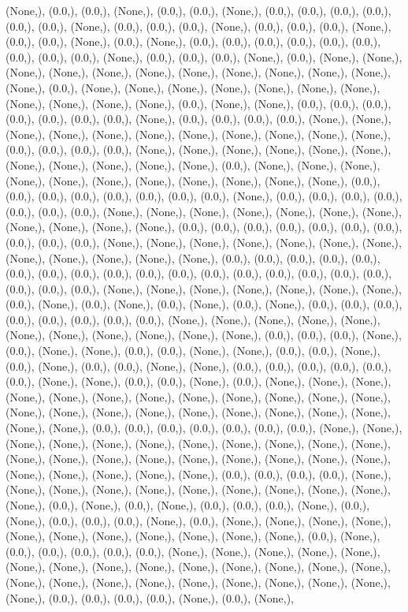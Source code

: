 \documentclass{article}
\begin{document}
(None,), (0.0,), (0.0,), (None,), (0.0,), (0.0,), (None,), (0.0,), (0.0,), (0.0,), (0.0,), (0.0,), (0.0,), (None,), (0.0,), (0.0,), (0.0,), (None,), (0.0,), (0.0,), (0.0,), (None,), (0.0,), (0.0,), (None,), (0.0,), (None,), (0.0,), (0.0,), (0.0,), (0.0,), (0.0,), (0.0,), (0.0,), (0.0,), (0.0,), (None,), (0.0,), (0.0,), (0.0,), (None,), (0.0,), (None,), (None,), (None,), (None,), (None,), (None,), (None,), (None,), (None,), (None,), (None,), (None,), (0.0,), (None,), (None,), (None,), (None,), (None,), (None,), (None,), (None,), (None,), (None,), (None,), (0.0,), (None,), (None,), (0.0,), (0.0,), (0.0,), (0.0,), (0.0,), (0.0,), (0.0,), (None,), (0.0,), (0.0,), (0.0,), (0.0,), (None,), (None,), (None,), (None,), (None,), (None,), (None,), (None,), (None,), (None,), (None,), (0.0,), (0.0,), (0.0,), (0.0,), (None,), (None,), (None,), (None,), (None,), (None,), (None,), (None,), (None,), (None,), (None,), (0.0,), (None,), (None,), (None,), (None,), (None,), (None,), (None,), (None,), (None,), (None,), (None,), (0.0,), (0.0,), (0.0,), (0.0,), (0.0,), (0.0,), (0.0,), (0.0,), (None,), (0.0,), (0.0,), (0.0,), (0.0,), (0.0,), (0.0,), (0.0,), (None,), (None,), (None,), (None,), (None,), (None,), (None,), (None,), (None,), (None,), (None,), (0.0,), (0.0,), (0.0,), (0.0,), (0.0,), (0.0,), (0.0,), (0.0,), (0.0,), (0.0,), (None,), (None,), (None,), (None,), (None,), (None,), (None,), (None,), (None,), (None,), (None,), (None,), (0.0,), (0.0,), (0.0,), (0.0,), (0.0,), (0.0,), (0.0,), (0.0,), (0.0,), (0.0,), (0.0,), (0.0,), (0.0,), (0.0,), (0.0,), (0.0,), (0.0,), (0.0,), (0.0,), (0.0,), (None,), (None,), (None,), (None,), (None,), (None,), (None,), (0.0,), (None,), (0.0,), (None,), (0.0,), (None,), (0.0,), (None,), (0.0,), (0.0,), (0.0,), (0.0,), (0.0,), (0.0,), (0.0,), (0.0,), (None,), (None,), (None,), (None,), (None,), (None,), (None,), (None,), (None,), (None,), (None,), (0.0,), (0.0,), (0.0,), (None,), (0.0,), (None,), (None,), (0.0,), (0.0,), (None,), (None,), (0.0,), (0.0,), (None,), (0.0,), (None,), (0.0,), (0.0,), (None,), (None,), (0.0,), (0.0,), (0.0,), (0.0,), (0.0,), (0.0,), (None,), (None,), (0.0,), (0.0,), (None,), (0.0,), (None,), (None,), (None,), (None,), (None,), (None,), (None,), (None,), (None,), (None,), (None,), (None,), (None,), (None,), (None,), (None,), (None,), (None,), (None,), (None,), (None,), (None,), (None,), (0.0,), (0.0,), (0.0,), (0.0,), (0.0,), (0.0,), (0.0,), (None,), (None,), (None,), (None,), (None,), (None,), (None,), (None,), (None,), (None,), (None,), (None,), (None,), (None,), (None,), (None,), (None,), (None,), (None,), (None,), (None,), (None,), (None,), (None,), (None,), (0.0,), (0.0,), (0.0,), (0.0,), (None,), (None,), (None,), (None,), (None,), (None,), (None,), (None,), (None,), (None,), (None,), (0.0,), (None,), (0.0,), (None,), (0.0,), (0.0,), (0.0,), (None,), (0.0,), (None,), (0.0,), (0.0,), (0.0,), (None,), (0.0,), (None,), (None,), (None,), (None,), (None,), (None,), (None,), (None,), (None,), (None,), (None,), (0.0,), (None,), (0.0,), (0.0,), (0.0,), (0.0,), (0.0,), (None,), (None,), (None,), (None,), (None,), (None,), (None,), (None,), (None,), (None,), (None,), (None,), (None,), (None,), (None,), (None,), (None,), (None,), (None,), (None,), (None,), (None,), (None,), (None,), (0.0,), (0.0,), (0.0,), (0.0,), (None,), (0.0,), (None,), 
\end{document}
